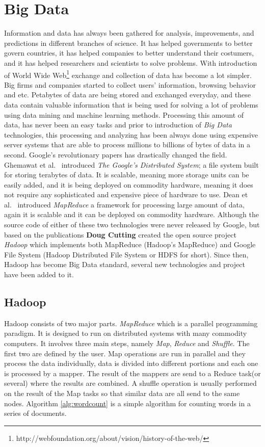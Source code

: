 \documentclass[english]{tktltiki}
\begin{document}
\section{Big Data}
\label{sec:bigdata}
Information and data has always been gathered for analysis, improvements, and predictions in different branches of science. It has helped governments to better govern countries, it has helped companies to better understand their costumers, and it has helped researchers and scientists to solve problems. With introduction of World Wide Web\footnote{http://webfoundation.org/about/vision/history-of-the-web/} exchange and collection of data has become a lot simpler. Big firms and companies started to collect users' information, browsing behavior and etc. Petabytes of data are being stored and exchanged everyday, and these data contain valuable information that is being used for solving a lot of problems using data mining and machine learning methods. 
Processing this amount of data, has never been an easy tasks and prior to introduction of \textit{Big Data} technologies, this processing and analyzing has been always done using expensive server systems that are able to process millions to billions of bytes of data in a second. 
Google's revolutionary papers has drastically changed the field. Ghemawat et al.\ \cite{ghemawat03} introduced \textit{The Google's Distributed System}; a file system built for storing terabytes of data. It is scalable, meaning more storage units can be easily added, and it is being deployed on commodity hardware, meaning it does not require any sophisticated and expensive piece of hardware to use. Dean et al.\ \cite{dean04} introduced \textit{MapReduce} a framework for processing large amount of data, again it is scalable and it can be deployed on commodity hardware. 
Although the source code of either of these two technologies were never released by Google, but based on the publications \textbf{Doug Cutting} created the open source project \textit{Hadoop} which implements both MapReduce (Hadoop's MapReduce) and Google File System (Hadoop Distributed File System or HDFS for short). Since then, Hadoop has become Big Data standard, several new technologies and project have been added to it.

\subsection{Hadoop}
Hadoop consists of two major parts. 
\textit{MapReduce} which is a parallel programming paradigm. It is designed to run on distributed systems with many commodity computers. It involves three main steps, namely \textit{Map}, \textit{Reduce} and \textit{Shuffle}. The first two are defined by the user. Map operations are run in parallel and they process the data individually, data is divided into different portions and each one is processed by a mapper. The result of the mappers are send to a Reduce task(or several) where the results are combined. A shuffle operation is usually performed on the result of the Map tasks so that similar data are all send to the same nodes. Algorithm \ref{alg:wordcount} is a simple algorithm for counting words in a series of documents. 
\end{document}
